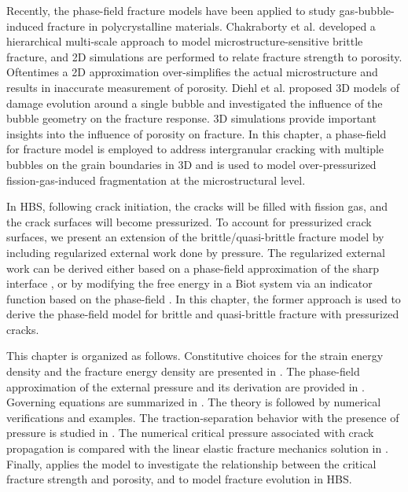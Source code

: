 Recently, the phase-field fracture models have been applied to study gas-bubble-induced fracture in polycrystalline materials. Chakraborty et al. \cite{pritam_2016} developed a hierarchical multi-scale approach to model microstructure-sensitive brittle fracture, and 2D simulations are performed to relate fracture strength to porosity. Oftentimes a 2D approximation over-simplifies the actual microstructure and results in inaccurate measurement of porosity. Diehl et al. \cite{Diehl2017} proposed 3D models of damage evolution around a single bubble and investigated the influence of the bubble geometry on the fracture response. 3D simulations provide important insights into the influence of porosity on fracture. In this chapter, a phase-field for fracture model is employed to address intergranular cracking with multiple bubbles on the grain boundaries in 3D and is used to model over-pressurized fission-gas-induced fragmentation at the microstructural level.

In HBS, following crack initiation, the cracks will be filled with fission gas, and the crack surfaces will become pressurized. To account for pressurized crack surfaces, we present an extension of the brittle/quasi-brittle fracture model by including regularized external work done by pressure. The regularized external work can be derived either based on a phase-field approximation of the sharp interface \cite{CHUKWUDOZIE2019957}, or by modifying the free energy in a Biot system via an indicator function based on the phase-field \cite{Mikeli__2015}. In this chapter, the former approach is used to derive the phase-field model for brittle and quasi-brittle fracture with pressurized cracks.

This chapter is organized as follows. Constitutive choices for the strain energy density and the fracture energy density are presented in .
The phase-field approximation of the external pressure and its derivation are provided in .
Governing equations are summarized in .
The theory is followed by numerical verifications and examples.
The traction-separation behavior with the presence of pressure is studied in .
The numerical critical pressure associated with crack propagation is compared with the linear elastic fracture mechanics solution in .
Finally,  applies the model to investigate the relationship between the critical fracture strength and porosity, and to model fracture evolution in HBS.
